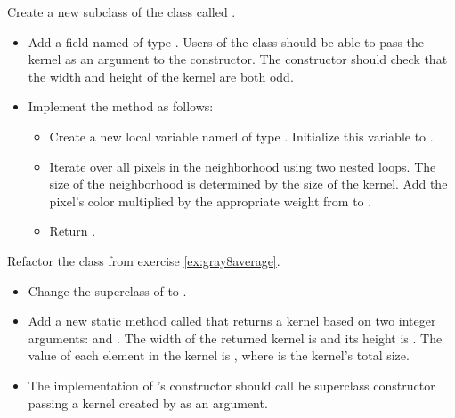 \documentclass{book}
\begin{document}
\begin{exercise}
Create a new subclass of the class  called .
\begin{itemize}
  \item Add a field named  of type . Users of the class should be able to pass the kernel as an argument to the constructor. The constructor should check that the width and height of the kernel are both odd.
  \item Implement the method  as follows:
  \begin{itemize}
    \item Create a new  local variable named  of type . Initialize this variable to .
    \item Iterate over all pixels in the neighborhood using two nested  loops. The size of the neighborhood is determined by the size of the kernel. Add the pixel's color multiplied by the appropriate weight from  to .
    \item Return .
  \end{itemize}
\end{itemize}
\end{exercise}

\begin{exercise}
Refactor the class  from exercise \ref{ex:gray8average}.
\begin{itemize}
  \item Change the superclass of  to .
  \item Add a new static method called  that returns a kernel based on two integer arguments:  and . The width of the returned kernel is  and its height is . The value of each element in the kernel is , where  is the kernel's total size.
  \item The implementation of 's constructor should call he superclass constructor passing a kernel created by  as an argument.
\end{itemize}
\end{exercise}
\end{document}
